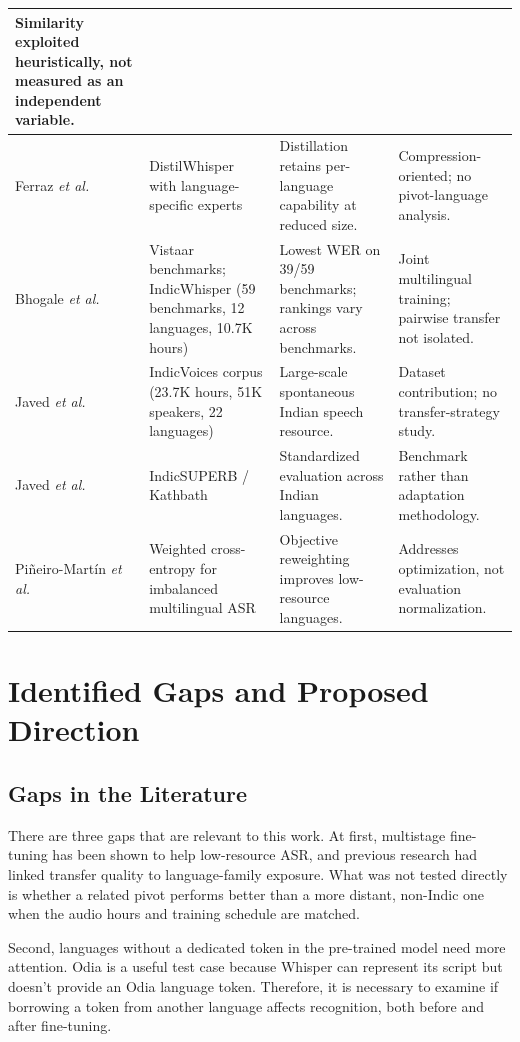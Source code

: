 \documentclass[conference]{IEEEtran}
\begin{document}
\begin{table}[!t]
\begin{tabular}{|p{2.5cm}|p{4.2cm}|p{4.9cm}|p{4.9cm}|}
Similarity exploited heuristically, not measured as an independent variable. \\
\hline
Ferraz \emph{et al.} \cite{ferraz2024distilwhisper} &
DistilWhisper with language-specific experts &
Distillation retains per-language capability at reduced size. &
Compression-oriented; no pivot-language analysis. \\
\hline
Bhogale \emph{et al.} \cite{bhogale2023vistaar} &
Vistaar benchmarks; IndicWhisper (59 benchmarks, 12 languages, 10.7K hours) &
Lowest WER on 39/59 benchmarks; rankings vary across benchmarks. &
Joint multilingual training; pairwise transfer not isolated. \\
\hline
Javed \emph{et al.} \cite{javed2024indicvoices} &
IndicVoices corpus (23.7K hours, 51K speakers, 22 languages) &
Large-scale spontaneous Indian speech resource. &
Dataset contribution; no transfer-strategy study. \\
\hline
Javed \emph{et al.} \cite{javed2023indicsuperb} &
IndicSUPERB / Kathbath &
Standardized evaluation across Indian languages. &
Benchmark rather than adaptation methodology. \\
\hline
Pi\~{n}eiro-Mart\'{i}n \emph{et al.} \cite{pineiro2024weighted} &
Weighted cross-entropy for imbalanced multilingual ASR &
Objective reweighting improves low-resource languages. &
Addresses optimization, not evaluation normalization. \\
\hline
\end{tabular}
\end{table}

\section{Identified Gaps and Proposed Direction}

\subsection{Gaps in the Literature}

There are three gaps that are relevant to this work. At first, multistage fine-tuning has been shown to help low-resource ASR, and previous research had linked transfer quality to language-family exposure. What was not tested directly is whether a related pivot performs better than a more distant, non-Indic one when the audio hours and training schedule are matched.

Second, languages without a dedicated token in the pre-trained model need more attention. Odia is a useful test case because Whisper can represent its script but doesn't provide an Odia language token. Therefore, it is necessary to examine if borrowing a token from another language affects recognition, both before and after fine-tuning.
\end{document}
